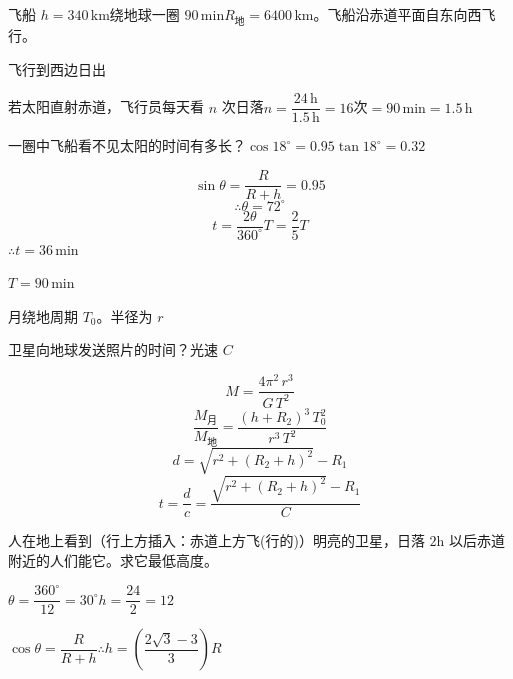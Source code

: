 \begin{problem}[3.]
飞船 $h=340\,\mathrm{km}$\quad 绕地球一圈 $90\,\mathrm{min}$\quad $R_{\text{地}}=6400\,\mathrm{km}$。飞船沿赤道平面自东向西飞行。

飞行到西边日出

若太阳直射赤道，飞行员每天看 $n$ 次日落\quad $n=\dfrac{24\,\mathrm{h}}{1.5\,\mathrm{h}}=16$次\quad {}$=90\,\mathrm{min}=1.5\,\mathrm{h}$

一圈中飞船看不见太阳的时间有多长？\quad $\cos18^\circ=0.95$\quad $\tan18^\circ=0.32$
\begin{solution}
\[ \sin\theta=\frac{R}{R+h}=0.95 \]
\[ \therefore\theta=72^\circ \]
\[ t=\frac{2\theta}{360^\circ}T=\frac{2}{5}T \]
\quad $\therefore t=36\,\mathrm{min}$%

$T=90\,\mathrm{min}$
\end{solution}
\end{problem}
\begin{problem}[4.]

月绕地周期 $T_0$。半径为 $r$

卫星向地球发送照片的时间？光速 $C$
\begin{solution}
\[ M=\frac{4\pi^2\,r^3}{G\,T^2} \]%
\[ \frac{M_{\text{月}}}{M_{\text{地}}}=\frac{(h+R_2)^3\,T_0^2}{r^3\,T^2} \]
\[ d=\sqrt{r^2+(R_2+h)^2}-R_1 \]
\[ t=\frac{d}{c}=\frac{\sqrt{r^2+(R_2+h)^2}-R_1}{C} \]
\end{solution}
\end{problem}
\begin{problem}[5.]

人在地上看到（行上方插入：赤道上方飞(行的)）明亮的卫星，日落 $2\mathrm{h}$ 以后赤道附近的人们能它。求它最低高度。
\begin{solution}
$\theta=\dfrac{360^\circ}{12}=30^\circ$\quad $h=\dfrac{24}{2}=12$

$\cos\theta=\dfrac{R}{R+h}$\quad $\therefore h=\left(\dfrac{2\sqrt{3}-3}{3}\right)R$
\end{solution}
\end{problem}
